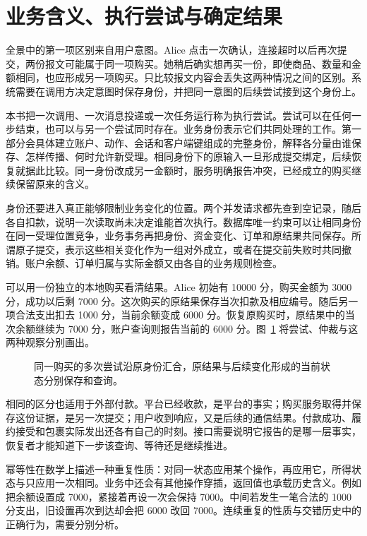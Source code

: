 \section*{业务含义、执行尝试与确定结果}

全景中的第一项区别来自用户意图。Alice 点击一次确认，连接超时以后再次提交，两份报文可能属于同一项购买。她稍后确实想再买一份，即使商品、数量和金额相同，也应形成另一项购买。只比较报文内容会丢失这两种情况之间的区别。系统需要在调用方决定意图时保存身份，并把同一意图的后续尝试接到这个身份上。

本书把一次调用、一次消息投递或一次任务运行称为执行尝试。尝试可以在任何一步结束，也可以与另一个尝试同时存在。业务身份表示它们共同处理的工作。第一部分会具体建立账户、动作、会话和客户端键组成的完整身份，解释各分量由谁保存、怎样传播、何时允许新受理。相同身份下的原输入一旦形成提交绑定，后续恢复就据此比较。同一身份改成另一金额时，服务明确报告冲突，已经成立的购买继续保留原来的含义。

身份还要进入真正能够限制业务变化的位置。两个并发请求都先查到空记录，随后各自扣款，说明一次读取尚未决定谁能首次执行。数据库唯一约束可以让相同身份在同一受理位置竞争，业务事务再把身份、资金变化、订单和原结果共同保存。所谓原子提交，表示这些相关变化作为一组对外成立，或者在提交前失败时共同撤销。账户余额、订单归属与实际金额又由各自的业务规则检查。

可以用一份独立的本地购买看清结果。Alice 初始有 10000 分，购买金额为 3000 分，成功以后剩 7000 分。这次购买的原结果保存当次扣款及相应编号。随后另一项合法支出扣去 1000 分，当前余额变成 6000 分。恢复原购买时，原结果中的当次余额继续为 7000 分，账户查询则报告当前的 6000 分。图~\ref{fig:overview-identity} 将尝试、仲裁与这两种观察分别画出。

\begin{figure}[htbp]
\centering

\caption{同一购买的多次尝试沿原身份汇合，原结果与后续变化形成的当前状态分别保存和查询。}
\label{fig:overview-identity}
\end{figure}

相同的区分也适用于外部付款。平台已经收款，是平台的事实；购买服务取得并保存这份证据，是另一次提交；用户收到响应，又是后续的通信结果。付款成功、履约接受和包裹实际发出还各有自己的时刻。接口需要说明它报告的是哪一层事实，恢复者才能知道下一步该查询、等待还是继续推进。

幂等性在数学上描述一种重复性质：对同一状态应用某个操作，再应用它，所得状态与只应用一次相同。业务中还会有其他操作穿插，返回值也承载历史含义。例如把余额设置成 7000，紧接着再设一次会保持 7000。中间若发生一笔合法的 1000 分支出，旧设置再次到达却会把 6000 改回 7000。连续重复的性质与交错历史中的正确行为，需要分别分析。

